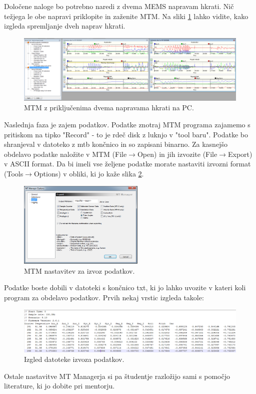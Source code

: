 Določene naloge bo potrebno naredi z dvema MEMS napravam hkrati. Nič težjega le obe napravi priklopite in zaženite MTM. Na sliki \ref{fig:v_mems_double} lahko vidite, kako izgleda spremljanje dveh naprav hkrati.

\begin{figure}[!h]
	\centering \includegraphics[width=12cm]{Vaje/ManevrZMems/figs/mtm_double.png}
	\caption{MTM z priključenima dvema napravama hkrati na PC.}
	\label{fig:v_mems_double}
\end{figure}

Naslednja faza je zajem podatkov. Podatke znotraj MTM programa zajamemo s pritiskom na tipko "Record" - to je rdeč disk z luknjo v "tool baru". Podatke bo shranjeval v datoteko z mtb končnico in so zapisani binarno. Za kasnejšo obdelavo podatke naložite v MTM (File$\to$Open) in jih izvozite (File$\to$Export) v ASCII format. Da bi imeli vse željene podatke morate nastaviti izvozni format (Tools$\to$Options) v obliki, ki jo kaže slika \ref{fig:v_mems_export}.

\begin{figure}[!h]
	\centering \includegraphics[width=6cm]{Vaje/ManevrZMems/figs/mtm_export.png}
	\caption{MTM nastavitev za izvoz podatkov.}
	\label{fig:v_mems_export}
\end{figure}

\newpage
Podatke boste dobili v datoteki s končnico txt, ki jo lahko uvozite v kateri koli program za obdelavo podatkov. Prvih nekaj vrstic izgleda takole:

\begin{figure}[!h]
	\centering \includegraphics[width=12cm]{Vaje/ManevrZMems/figs/mtm_e_ascii.png}
	\caption{Izgled datoteke izvoza podatkov.}
	\label{fig:v_mems_e_ascii}
\end{figure}
\noindent
Ostale nastavitve MT Managerja si pa študentje razložijo sami s pomočjo literature, ki jo dobite pri mentorju.

